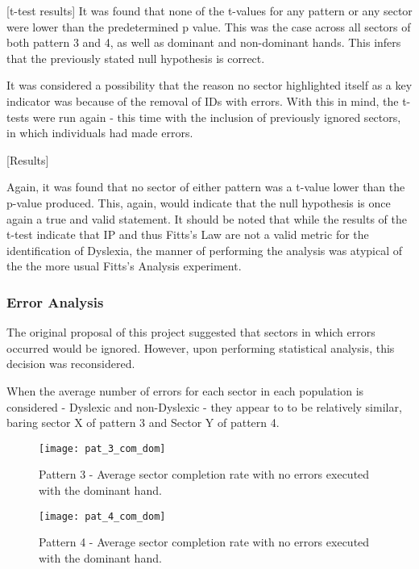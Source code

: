 		[t-test results]
		It was found that none of the t-values for any pattern or any sector were lower than the predetermined p value. This was the case across all sectors of both pattern 3 and 4, as well as dominant and non-dominant hands. This infers that the previously stated null hypothesis is correct. 

		It was considered a possibility that the reason no sector highlighted itself as a key indicator was because of the removal of IDs with errors. With this in mind, the t-tests were run again - this time with the inclusion of previously ignored sectors, in which individuals had made errors.

		[Results]

		Again, it was found that no sector of either pattern was a t-value lower than the p-value produced. This, again, would indicate that the null hypothesis is once again a true and valid statement.
		It should be noted that while the results of the t-test indicate that IP and thus Fitts’s Law are not a valid metric for the identification of Dyslexia, the manner of performing the analysis was atypical of the the more usual Fitts’s Analysis experiment.

	\subsubsection{Error Analysis}
		The original proposal of this project suggested that sectors in which errors occurred would be ignored. However, upon performing statistical analysis, this decision was reconsidered.
		
		When the average number of errors for each sector in each population is considered - Dyslexic and non-Dyslexic - they appear to to be relatively similar, baring sector X of pattern 3 and Sector Y of pattern 4.
		
		
		\begin{figure}[h]
			\centering
			\texttt{[image: pat\_3\_com\_dom]}
			\caption{Pattern 3 - Average sector completion rate with no errors executed with the dominant hand.}
			\label{fig_pat_3_com_dom}
		\end{figure}		
		
		\begin{figure}[]
			\centering
			\texttt{[image: pat\_4\_com\_dom]}
			\caption{Pattern 4 - Average sector completion rate with no errors executed with the dominant hand.}
			\label{fig_pat_4_com_dom}
		\end{figure}
		
